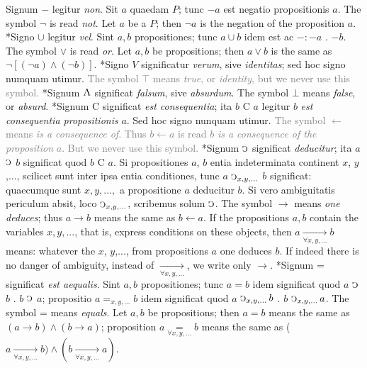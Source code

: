 \documentclass{book}
\newcommand{\C}{\mathop{\sbox0{$\displaystyle$$\reflectbox{C}$} %
\raisebox{-\height+\ht0-0.05cm}[\ht0][\dp0]{\scalebox{0.8}[0.8]{\copy0}}}\displaylimits} %
\newcommand{\abs}{\mathop{\rotatebox[origin=c]{180}{V}}}
\newcommand\irrelavent[1]{\textcolor{gray}{#1}}
\newenvironment{translateTwoCol}
               { %
                 \columnratio{0.5, 0.5} \begin{paracol}{2}
                 \newcommand{\LAT}{\switchcolumn[0]*}
                 \newcommand{\ENG}{\switchcolumn[1]}
               }
               { %
                 \let\ENG\undefined
                 \let\LAT\undefined
                 \end{paracol}
               }
\begin{document}
\begin{translateTwoCol}
Signum $-$ legitur \emph{non}. Sit $a$ quaedam $P$; tunc $-a$ est negatio propositionis $a$.
\ENG The symbol $\neg$ is read \emph{not}. Let $a$ be a $P$; then $\neg a$ is the negation of the proposition $a$.
\LAT Signo $\cup$ legitur \emph{vel}. Sint $a,b$ propositiones; tunc $a \cup b$ idem est ac $-:-a$ $.$ $-b$.
\ENG The symbol $\vee$ is read \emph{or}. Let $a,b$ be propositions; then $a \vee b$ is the same as $\neg[(\neg a) \wedge (\neg b)]$.
\LAT \text{[}Signo $V$ significatur \emph{verum}, sive \emph{identitas}; sed hoc signo numquam utimur\text{]}.  %
\ENG \irrelavent{The symbol $\top$  means \emph{true}, or \emph{identity}, but we never use this symbol.}
\LAT Signum  $\abs$ significat \emph{falsum}, sive \emph{absurdum}.
\ENG The symbol $\bot$ means \emph{false}, or \emph{absurd}.
\LAT \text{[}Signum C significat \emph{est consequentia}; ita $b$ C $a$ legitur $b$ \emph{est consequentia propositionis} $a$. Sed hoc signo nunquam utimur\text{]}.
\ENG \irrelavent{The symbol $\leftarrow$ means \emph{is a consequence of}. Thus $b \leftarrow a$ is read $b$ \emph{is a consequence of the proposition} $a$. But we never use this symbol.}
\LAT Signum $\C$ significat \emph{deducitur}; ita $a$ $\C$ $b$ significat quod $b$ C $a$. Si propositiones $a$, $b$ entia indeterminata continent $x$, $y$,..., scilicet sunt inter ipsa entia conditiones, tunc $a$ $\C_{x,y,...}$ $b$ significat: quaecumque sunt $x,y,...,$ a propositione $a$ deducitur $b$. Si vero ambiguitatis periculum absit, loco $\C_{x,y,...}$, scribemus solum $\C$.
\ENG The symbol $\rightarrow$ means \emph{one deduces}; thus $a \rightarrow b$ means the same as $b \leftarrow a$. If the propositions $a,b$ contain the variables $x,y,...$, that is, express conditions on these objects, then $a \xrightarrow[\forall x,y,...]{} b$ means: whatever the $x$, $y$,..., from propositions $a$ one deduces $b$. If indeed there is no danger of ambiguity, instead of $\xrightarrow[\forall x,y,...]{}$, we write only $\rightarrow$.
\LAT Signum = significat \emph{est aequalis}. Sint $a,b$ propositiones; tunc $a=b$ idem significat quod $a$ $\C$ $b$ $.$ $b$ $\C$ $a$; propositio $a=_{x,y,...} b$ idem significat quod $a$ $ \C_{x,y,...} b$ $.$ $b$ $\C_{x,y,...} a$.
\ENG The symbol = means \emph{equals}. Let $a,b$ be propositions; then $a=b$ means the same as $(a \rightarrow b) \wedge (b \rightarrow a)$; proposition $a\underset{\forall x,y,...}=b$ means the same as ($a \xrightarrow[\forall x,y,...]{} b) \wedge (b \xrightarrow[\forall x,y,...]{} a)$.
\end{translateTwoCol}
\end{document}
